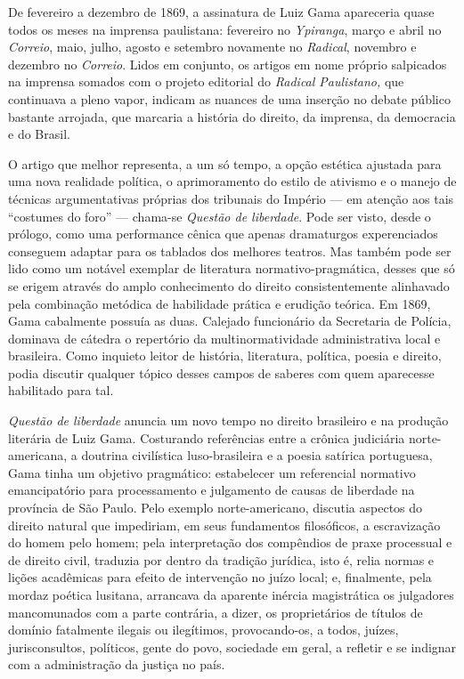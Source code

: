 De fevereiro a dezembro de 1869, a assinatura de Luiz Gama apareceria
quase todos os meses na imprensa paulistana: fevereiro no \emph{Ypiranga}, 
março e abril no \emph{Correio}, maio, julho, agosto e
setembro novamente no \emph{Radical}, novembro e dezembro no
\emph{Correio}. Lidos em conjunto, os artigos em nome próprio salpicados
na imprensa somados com o projeto editorial do \emph{Radical
Paulistano,} que continuava a pleno vapor, indicam as nuances de uma
inserção no debate público bastante arrojada, que marcaria a história do
direito, da imprensa, da democracia e do Brasil.

O artigo que melhor representa, a um só tempo, a opção estética ajustada
para uma nova realidade política, o aprimoramento do estilo de ativismo
e o manejo de técnicas argumentativas próprias dos tribunais do Império
--- em atenção aos tais ``costumes do foro'' --- chama-se \emph{Questão de
liberdade}. Pode ser visto, desde o prólogo, como uma performance cênica
que apenas dramaturgos experenciados conseguem adaptar para os tablados
dos melhores teatros. Mas também pode ser lido como um notável exemplar
de literatura normativo-pragmática, desses que só se erigem através do
amplo conhecimento do direito consistentemente alinhavado pela
combinação metódica de habilidade prática e erudição teórica. Em 1869,
Gama cabalmente possuía as duas. Calejado funcionário da Secretaria de
Polícia, dominava de cátedra o repertório da multinormatividade
administrativa local e brasileira. Como inquieto leitor de história,
literatura, política, poesia e direito, podia discutir qualquer tópico
desses campos de saberes com quem aparecesse habilitado para tal.

\emph{Questão de liberdade} anuncia um novo tempo no direito brasileiro
e na produção literária de Luiz Gama. Costurando referências entre a
crônica judiciária norte-americana, a doutrina civilística
luso-brasileira e a poesia satírica portuguesa, Gama tinha um objetivo
pragmático: estabelecer um referencial normativo emancipatório para
processamento e julgamento de causas de liberdade na província de São
Paulo. Pelo exemplo norte-americano, discutia aspectos do direito
natural que impediriam, em seus fundamentos filosóficos, a escravização
do homem pelo homem; pela interpretação dos compêndios de praxe
processual e de direito civil, traduzia por dentro da tradição jurídica,
isto é, relia normas e lições acadêmicas para efeito de intervenção no
juízo local; e, finalmente, pela mordaz poética lusitana, arrancava da
aparente inércia magistrática os julgadores mancomunados com a parte
contrária, a dizer, os proprietários de títulos de domínio fatalmente
ilegais ou ilegítimos, provocando-os, a todos, juízes, jurisconsultos,
políticos, gente do povo, sociedade em geral, a refletir e se indignar
com a administração da justiça no país.

